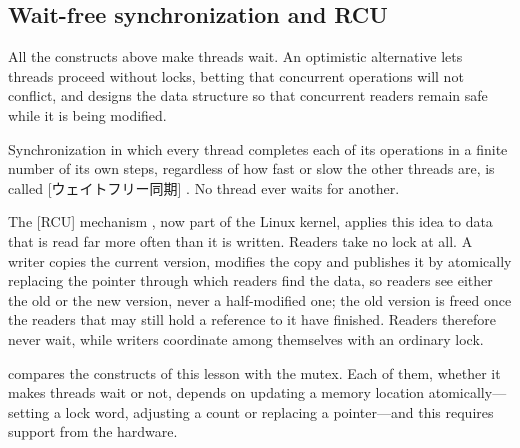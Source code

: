 \documentclass[../main.tex]{subfiles}
\begin{document}
\subsection{Wait-free synchronization and RCU}

All the constructs above make threads wait.  An optimistic alternative lets
threads proceed without locks, betting that concurrent operations will not
conflict, and designs the data structure so that concurrent readers remain
safe while it is being modified.

\begin{definition}
  Synchronization in which every thread completes each of its operations
  in a finite number of its own steps, regardless of how fast or slow the
  other threads are, is called
  [ウェイトフリー同期] \cite{herlihy1991}.
  No thread ever waits for another.
\end{definition}

The [RCU]
mechanism \cite{mckenney1998}, now part of the Linux kernel, applies this
idea to data that is read far more often than it is written.  Readers take
no lock at all.  A writer copies the current version, modifies the copy and
publishes it by atomically replacing the pointer through which readers find
the data, so readers see either the old or the new version, never a
half-modified one; the old version is freed once the readers that may still
hold a reference to it have finished.  Readers therefore never wait, while
writers coordinate among themselves with an ordinary lock.

 compares the constructs of this lesson with the
mutex.  Each of them, whether it makes threads wait or not, depends on
updating a memory location atomically---setting a lock word, adjusting a
count or replacing a pointer---and this requires support from the hardware.
\end{document}

